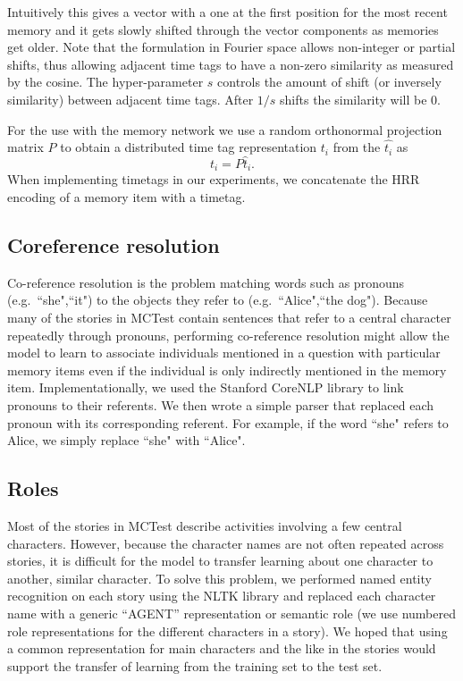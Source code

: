 \documentclass[10pt]{article}
\begin{document}
Intuitively this gives a vector with a one at the first position for the most 
recent memory and it gets slowly shifted through the vector components as 
memories get older. Note that the formulation in Fourier space allows 
non-integer or partial shifts, thus allowing adjacent time tags to have 
a non-zero similarity as measured by the cosine. The hyper-parameter $s$ 
controls the amount of shift (or inversely similarity) between adjacent time 
tags. After $1/s$ shifts the similarity will be 0.

For the use with the memory network we use a random orthonormal projection 
matrix $P$ to obtain a distributed time tag representation $t_i$ from the 
$\hat{t_i}$ as
\begin{equation}
    t_i = P \hat t_i \text{.}
\end{equation}
\noindent
When implementing timetags in our experiments, we concatenate the HRR encoding of a memory item with a timetag. 

\subsection{Coreference resolution}

Co-reference resolution is the problem matching words such as pronouns (e.g.\ ``she",``it") to the objects they refer to (e.g.\ ``Alice",``the dog"). Because many of the stories in MCTest contain sentences that refer to a central character repeatedly through pronouns, performing co-reference resolution might allow the model to learn to associate individuals mentioned in a question with particular memory items even if the individual is only indirectly mentioned in the memory item. Implementationally, we used the Stanford CoreNLP library to link pronouns to their referents. We then wrote a simple parser that replaced each pronoun with its corresponding referent. For example, if the word ``she" refers to Alice, we simply replace ``she" with ``Alice".

\subsection{Roles}

Most of the stories in MCTest describe activities involving a few central characters. However, because the character names are not often repeated across stories, it is difficult for the model to transfer learning about one character to another, similar character. To solve this problem, we performed named entity recognition on each story using the NLTK library and replaced each character name with a generic ``AGENT'' representation or semantic role (we use numbered role representations for the different characters in a story). We hoped that using a common representation for main characters and the like in the stories would support the transfer of learning from the training set to the test set.
\end{document}
